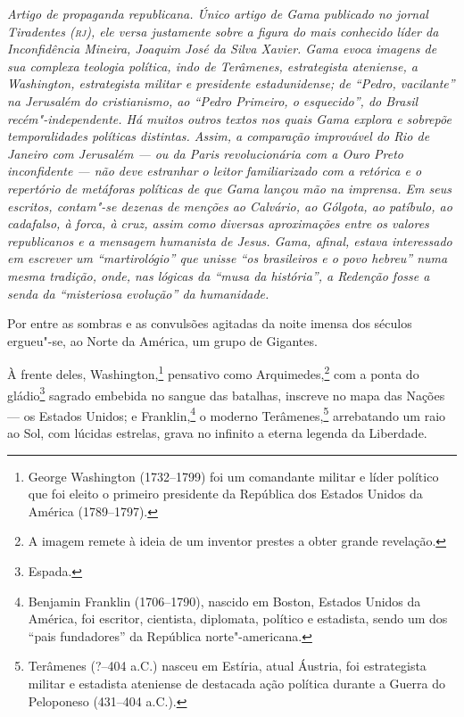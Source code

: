 \begin{flushleft}
{\footnotesize\itshape
Artigo de propaganda republicana. Único artigo de Gama publicado
no jornal Tiradentes (\textsc{rj}), ele versa justamente sobre a figura do mais
conhecido líder da Inconfidência Mineira, Joaquim José da Silva Xavier.
Gama evoca imagens de sua complexa teologia política,
indo de Terâmenes, estrategista ateniense, a
Washington, estrategista militar e presidente estadunidense; de ``Pedro,
vacilante'' na Jerusalém do cristianismo, ao ``Pedro Primeiro, o
esquecido'', do Brasil recém"-independente. Há muitos outros textos nos
quais Gama explora e sobrepõe temporalidades políticas
distintas. Assim, a comparação improvável do Rio de Janeiro com
Jerusalém --- ou da Paris revolucionária com a Ouro
Preto inconfidente --- não deve estranhar o leitor familiarizado com a
retórica e o repertório de metáforas políticas de que Gama lançou mão
na imprensa. Em seus escritos, contam"-se dezenas de
menções ao Calvário, ao Gólgota, ao patíbulo, ao cadafalso, à forca, à
cruz, assim como diversas aproximações entre os valores republicanos e a
mensagem humanista de Jesus. Gama, afinal, estava interessado em
escrever um ``martirológio'' que unisse ``os brasileiros e o povo hebreu''
numa mesma tradição, onde, nas lógicas da ``musa da história'', a Redenção
fosse a senda da ``misteriosa evolução'' da humanidade. }
\end{flushleft}

Por entre as sombras e as convulsões agitadas da noite imensa dos
séculos ergueu"-se, ao Norte da América, um grupo de Gigantes.

À frente deles, Washington,\footnote{George Washington (1732--1799) foi
  um comandante militar e líder político que foi eleito o primeiro
  presidente da República dos Estados Unidos da América (1789--1797).}
pensativo como Arquimedes,\footnote{A
  imagem remete à ideia de um inventor prestes a obter grande revelação.}
com a ponta do gládio\footnote{Espada.} sagrado embebida no sangue das
batalhas, inscreve no mapa das Nações --- os Estados Unidos; e
Franklin,\footnote{Benjamin Franklin (1706--1790), nascido em Boston,
  Estados Unidos da América, foi escritor, cientista, diplomata,
  político e estadista, sendo um dos ``pais fundadores'' da República
  norte"-americana.} o moderno Terâmenes,\footnote{Terâmenes (?--404
  a.C.) nasceu em Estíria, atual Áustria, foi estrategista militar e
  estadista ateniense de destacada ação política durante a Guerra do
  Peloponeso (431--404 a.C.).} arrebatando um raio ao Sol, com
lúcidas estrelas, grava no infinito a eterna legenda da Liberdade.

